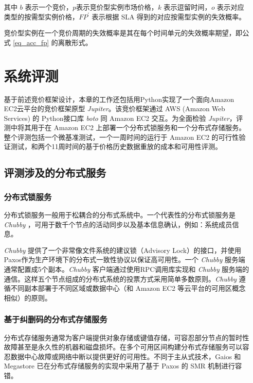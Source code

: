 其中 $b$ 表示一个竞价，$p$表示竞价型实例市场价格，$k$ 表示逗留时间，$o$ 表示对应类型的按需型实例价格，$FP^{\prime}$ 表示根据 SLA 得到的对应按需型实例的失效概率。

竞价型实例在一个竞价周期的失效概率是其在每个时间单元的失效概率期望，即公式 \eqref{eq_acc_fp} 的离散形式。

\section{系统评测}
\label{sec:jupiter-evaluation}
基于前述竞价框架设计，本章的工作还包括用Python实现了一个面向Amazon EC2云平台的竞价框架原型 \emph{Jupiter}。该竞价框架通过 AWS (Amazon Web Services) 的 Python接口库 \emph{boto} \cite{boto:2014} 同 Amazon EC2 交互。为全面检验 \emph{Jupiter}，评测中将其用于在 Amazon EC2 上部署一个分布式锁服务和一个分布式存储服务。整个评测包括一个微基准测试，一个一周时间的运行于 Amazon EC2 的可行性验证测试，和两个11周时间的基于价格历史数据重放的成本和可用性评测。

\subsection{评测涉及的分布式服务}
\label{subsec:jupiter-bc}

\subsubsection{分布式锁服务}
\label{subsection-case-dls}
分布式锁服务一般用于松耦合的分布式系统中。一个代表性的分布式锁服务是 \emph{Chubby} \cite{Burrows:2006:CLS:1298455.1298487}，可用于数千个节点的活动同步以及基本信息确认，例如：系统成员信息。

\emph{Chubby} 提供了一个非常像文件系统的建议锁（Advisory Lock）的接口，并使用Paxos作为生产环境下的分布式一致性协议以保证高可用性。一个 \emph{Chubby} 服务端通常配置成5个副本。\emph{Chubby} 客户端通过使用RPC调用库实现和 \emph{Chubby} 服务端的通信。这样五个节点组成的分布式系统的投票方式采用简单多数原则。\emph{Chubby} 遵循不同副本部署于不同区域或数据中心（和 Amazon EC2 等云平台的可用区概念相似）的原则。

\subsubsection{基于纠删码的分布式存储服务}
\label{subsubsec:dss}
分布式存储服务通常为客户端提供对象存储或键值存储，可容忍部分节点的暂时性故障甚至是永久性的机器和磁盘损坏。在多个可用区间构建分布式存储服务可以容忍数据中心故障或网络中断以提供更好的可用性。不同于主从式技术，Gaios \cite{Bolosky:2011:PRS:1972457.1972472} 和 Megastore \cite{baker2011megastore} 已在分布式存储服务的实现中采用了基于 Paxos 的 SMR 机制进行容错。

